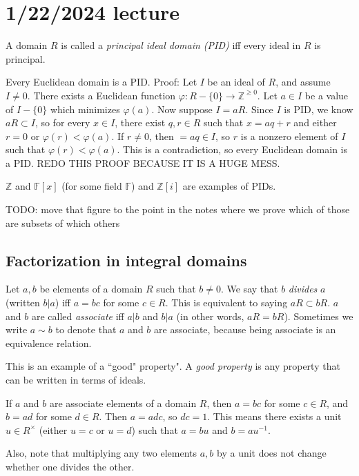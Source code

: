 \documentclass[12pt]{article}
\begin{document}
\section{1/22/2024 lecture}
A domain $R$ is called a \textit{principal ideal domain (PID)} iff every ideal in $R$ is principal.
\par
Every Euclidean domain is a PID. Proof: Let $I$ be an ideal of $R$, and assume $I \neq 0$. There exists a Euclidean function $\varphi: R-\{0\} \rightarrow \mathbb{Z}^{\geq 0}$. Let $a \in I$ be a value of $I - \{0\}$ which minimizes $\varphi(a)$. Now suppose $I=aR$. Since $I$ is  PID, we know $aR \subset I$, so for every $x \in I$, there exist $q,r \in R$ such that $x=aq+r$ and either $r=0$ or $\varphi(r) < \varphi(a)$. If $r \neq 0$, then $=aq \in I$, so $r$ is a nonzero element of $I$ such that $\varphi(r) < \varphi(a)$. This is a contradiction, so every Euclidean domain is a PID. REDO THIS PROOF BECAUSE IT IS A HUGE MESS.
\par
$ \mathbb{Z}$ and $\mathbb{F}[x]$ (for some field $\mathbb{F}$) and $ \mathbb{Z}[i]$ are examples of PIDs.

\begin{center}
\end{center}
TODO: move that figure to the point in the notes where we prove which of those are subsets of which others

\subsection{Factorization in integral domains}
Let $a,b$ be elements of a domain $R$ such that $b \neq 0$. We say that $b$ \textit{divides} $a$ (written $b|a$) iff $a=bc$ for some $c \in R$. This is equivalent to saying $aR \subset bR$. $a$ and $b$ are called \textit{associate} iff $a|b$ and $b|a$ (in other words, $aR=bR$). Sometimes we write $a \sim b$ to denote that $a$ and $b$ are associate, because being associate is an equivalence relation.
\par
This is an example of a ``good" property". A \textit{good property} is any property that can be written in terms of ideals.
\par
If $a$ and $b$ are associate elements of a domain $R$, then $a=bc$ for some $c \in R$, and $b=ad$ for some $d \in R$. Then $a=adc$, so $dc=1$. This means there exists a unit $u \in R^\times$ (either $u=c$ or $u=d$) such that $a=bu$ and $b=au^{-1}$.
\par
Also, note that multiplying any two elements $a,b$ by a unit does not change whether one divides the other.
\end{document}
